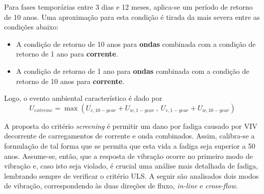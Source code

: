 Para fases temporárias entre 3 dias e 12 meses, aplica-se um período de retorno de 10 anos.
Uma aproximação para esta condição é tirada da mais severa entre as condições abaixo:
\begin{itemize}
\item A condição de retorno de 10 anos para \textbf{ondas} combinada com a condição de retorno de 1 ano para \textbf{corrente}.
\item A condição de retorno de 1 ano para \textbf{ondas} combinada com a condição de retorno de 10 anos para \textbf{corrente}.
\end{itemize}

Logo, o evento ambiental característico é dado por
\begin{equation}
U_\mathit{extreme} =  \max\left( U_{c,10-\mathit{year}} + U_{w,1-\mathit{year}} ~,~ U_{c,1-\mathit{year}} + U_{w,10-{year}} \right)
\end{equation}

A proposta do critério \textit{screening} é permitir um dano por fadiga causado por VIV decorrente de carregamentos de corrente e onda combinados.
Assim, calibra-se a formulação de tal forma que se permita que esta vida a fadiga seja superior a 50 anos.
Assume-se, então, que a resposta de vibração ocorre no primeiro modo de vibração e, caso isto seja violado, é crucial uma análise mais detalhada de fadiga, lembrando sempre de verificar o critério ULS.
A seguir são analisados dois modos de vibração, correspondendo às duas direções de fluxo, \textit{in-line} e \textit{cross-flow}.

